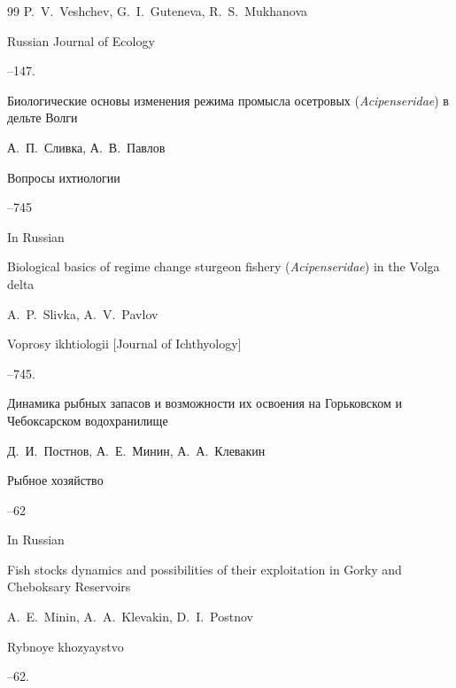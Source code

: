 \begin{thebibliography}{99}
\by P.~V.~Veshchev, G.~I.~Guteneva, R.~S.~Mukhanova

\jour Russian Journal of Ecology




--147.





\paper Биологические основы изменения режима промысла осетровых ({\it Acipenseridae}) в дельте Волги

\by А.~П.~Сливка, А.~В.~Павлов

\jour Вопросы ихтиологии



--745

\misctransl 

\lang In Russian

\paper Biological basics of regime change sturgeon fishery ({\it Acipenseridae}) in the Volga delta

\by A.~P.~Slivka, A.~V.~Pavlov

\jour Voprosy ikhtiologii \rm [Journal of Ichthyology]



--745.








\paper Динамика рыбных запасов и возможности их освоения на Горьковском и Чебоксарском водохранилище

\by Д.~И.~Постнов, А.~Е.~Минин, А.~А.~Клевакин

\jour Рыбное хозяйство



--62


\misctransl

\lang In Russian

\paper Fish stocks dynamics and possibilities of their exploitation in Gorky and Cheboksary Reservoirs

\by A.~E.~Minin, A.~A.~Klevakin, D.~I.~Postnov

\jour Rybnoye khozyaystvo



--62.







\end{thebibliography}









